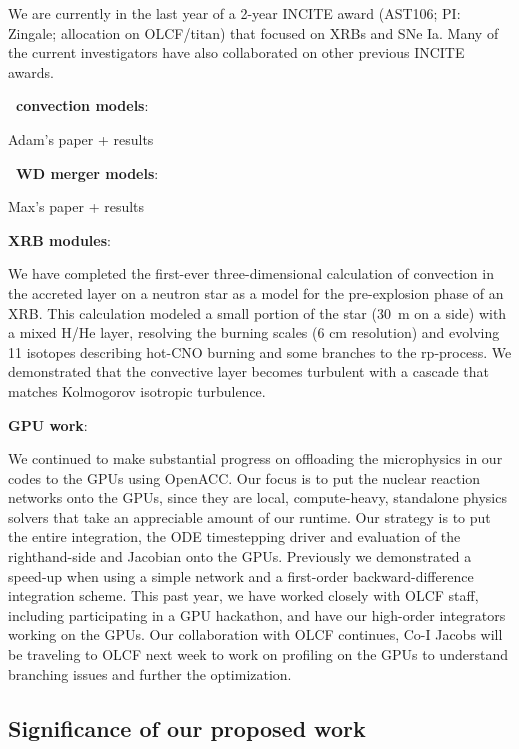 \documentclass[11pt,letterpaper,english]{article}
\begin{document}
We are currently in the last year of a 2-year INCITE award (AST106;
PI: Zingale; allocation on OLCF/titan) that focused on XRBs and SNe
Ia.  Many of the current investigators have also collaborated on other
previous INCITE awards.  

{\bf \maestro\ convection models}:
%

Adam's paper + results

{\bf \castro\ WD merger models}:
%

Max's paper + results



{\bf \maestro XRB modules}:

We have completed the first-ever three-dimensional calculation of
convection in the accreted layer on a neutron star as a model for the
pre-explosion phase of an XRB.  This calculation modeled a small
portion of the star (30~m on a side) with a mixed H/He layer,
resolving the burning scales (6 cm resolution) and evolving 11
isotopes describing hot-CNO burning and some branches to the
rp-process.  We demonstrated that the convective layer becomes
turbulent with a cascade that matches Kolmogorov isotropic turbulence.



{\bf GPU work}:

We continued to make substantial progress on offloading the
microphysics in our codes to the GPUs using OpenACC.  Our focus is to
put the nuclear reaction networks onto the GPUs, since they are local,
compute-heavy, standalone physics solvers that take an appreciable
amount of our runtime. Our strategy is to put the entire integration,
the ODE timestepping driver and evaluation of the righthand-side and
Jacobian onto the GPUs.  Previously we demonstrated a speed-up when
using a simple network and a first-order backward-difference
integration scheme.  This past year, we have worked closely with OLCF
staff, including participating in a GPU hackathon, and have our
high-order integrators working on the GPUs.  Our collaboration
with OLCF continues, Co-I Jacobs will be traveling to OLCF next week
to work on profiling on the GPUs to understand branching issues and
further the optimization.




\subsection{Significance of our proposed work}
\end{document}
